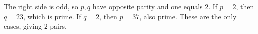 The right side is odd, so $p,q$ have opposite parity and one equals 2. If $p=2$, then $q=23$, which is prime. If $q=2$, then $p=37$, also prime. These are the only cases, giving $\boxed2$ pairs.
